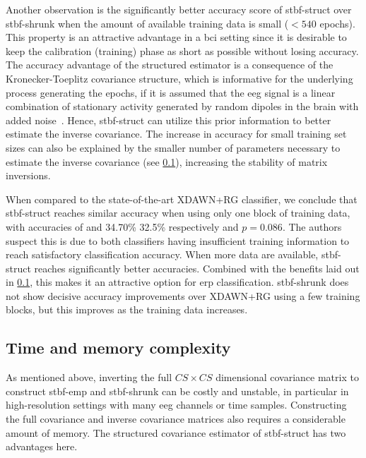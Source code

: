 	Another observation is the significantly better accuracy score of
	\ac{stbf-struct} over \ac{stbf-shrunk} when the amount of available
  training data is small ($<540$ epochs).
	This property is an attractive advantage in a \ac{bci} setting since it is desirable to keep the calibration (training) phase as short as possible without losing accuracy.
	The accuracy advantage of the structured estimator is a consequence of the
	Kronecker-Toeplitz covariance structure, which is informative for the
	underlying process generating the epochs, if it is assumed that the \ac{eeg} signal
	is a linear combination of stationary activity generated by random dipoles in
	the brain with added noise~\cite{Munck1992, DeMunck2002, GonzalezNavarro2017}.
	Hence, \ac{stbf-struct} can utilize this prior information to better estimate the inverse
	covariance.
  The increase in accuracy for small training set sizes can also be explained by the smaller number of parameters necessary to estimate the inverse covariance (see \cref{sec:stbf-struct/discussion/param-complex}), increasing the stability of matrix inversions.

	When compared to the state-of-the-art XDAWN+RG classifier, we conclude
	that \ac{stbf-struct} reaches similar accuracy when using only one block of
  training data, with accuracies of and 34.70\% 32.5\% respectively and $p=0.086$.
	The authors suspect this is due to both	classifiers having insufficient training
  information to reach satisfactory classification accuracy.
	When more data are available, \ac{stbf-struct} reaches significantly
  better accuracies.
	Combined with the benefits laid out in \cref{sec:stbf-struct/discussion/param-complex}, this
  makes it an attractive option for \ac{erp} classification.
	\ac{stbf-shrunk} does not show decisive accuracy improvements over
	XDAWN+RG using a few training blocks, but this improves as the
  training data increases.

	\subsection{Time and memory complexity}
	\label{sec:stbf-struct/discussion/param-complex}
	As mentioned above, inverting the full $CS \times CS$ dimensional covariance
	matrix to construct \ac{stbf-emp} and \ac{stbf-shrunk} can be costly
	and unstable, in particular in high-resolution settings with many \ac{eeg} channels or time samples.
	Constructing the full covariance and inverse covariance matrices also requires a considerable amount of memory.
	The structured covariance estimator of \ac{stbf-struct} has two advantages here.

